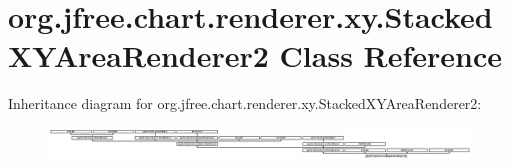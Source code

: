 \hypertarget{classorg_1_1jfree_1_1chart_1_1renderer_1_1xy_1_1_stacked_x_y_area_renderer2}{}\section{org.\+jfree.\+chart.\+renderer.\+xy.\+Stacked\+X\+Y\+Area\+Renderer2 Class Reference}
\label{classorg_1_1jfree_1_1chart_1_1renderer_1_1xy_1_1_stacked_x_y_area_renderer2}
Inheritance diagram for org.\+jfree.\+chart.\+renderer.\+xy.\+Stacked\+X\+Y\+Area\+Renderer2\+:\begin{figure}[H]
\begin{center}
\leavevmode
\includegraphics[height=0.853659cm]{classorg_1_1jfree_1_1chart_1_1renderer_1_1xy_1_1_stacked_x_y_area_renderer2}
\end{center}
\end{figure}
